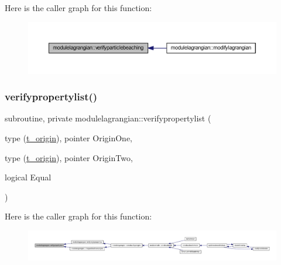 Here is the caller graph for this function\+:\nopagebreak
\begin{figure}[H]
\begin{center}
\leavevmode
\includegraphics[width=350pt]{namespacemodulelagrangian_abaac5c633b5d8d05a11c32bbee80acaa_icgraph}
\end{center}
\end{figure}
\mbox{\label{namespacemodulelagrangian_a601110ba1a707464fc0bffce5261fe4b}} 
\subsubsection{\texorpdfstring{verifypropertylist()}{verifypropertylist()}}
{\footnotesize\ttfamily subroutine, private modulelagrangian\+::verifypropertylist (\begin{DoxyParamCaption}\item[{type (\mbox{\hyperlink{structmodulelagrangian_1_1t__origin}{t\+\_\+origin}}), pointer}]{Origin\+One,  }\item[{type (\mbox{\hyperlink{structmodulelagrangian_1_1t__origin}{t\+\_\+origin}}), pointer}]{Origin\+Two,  }\item[{logical}]{Equal }\end{DoxyParamCaption})\hspace{0.3cm}{\ttfamily [private]}}

Here is the caller graph for this function\+:\nopagebreak
\begin{figure}[H]
\begin{center}
\leavevmode
\includegraphics[width=350pt]{namespacemodulelagrangian_a601110ba1a707464fc0bffce5261fe4b_icgraph}
\end{center}
\end{figure}
\mbox{\label{namespacemodulelagrangian_af983501fcd8d5abbf81124ad3229d435}} 
